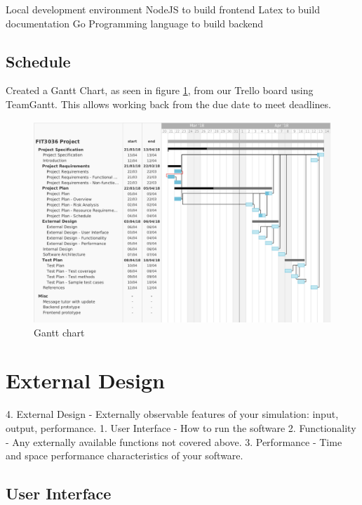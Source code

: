 \documentclass[a4paper,11pt]{article}
\begin{document}
Local development environment
NodeJS to build frontend
Latex to build documentation
Go Programming language to build backend

\subsection{Schedule}


Created a Gantt Chart, as seen in figure \ref{fig:gantt}, from our Trello board using TeamGantt. This allows working back from the due date to meet deadlines.

\begin{figure}[H]
\includegraphics[width=\textwidth]{gantt-chart}
\caption{Gantt chart}
    \label{fig:gantt}
\end{figure}


\section{External Design}


4. External Design - Externally observable features of your simulation: input, output, performance.
  1. User Interface - How to run the software
  2. Functionality - Any externally available functions not covered above.
  3. Performance - Time and space performance characteristics of your software.


\subsection{User Interface}
\end{document}

